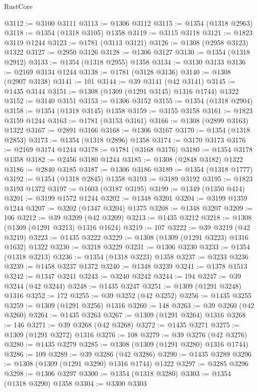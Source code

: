 \begin{lexlean}{RustCore}
\begin{coremodule}
@3112 := @3100 @3111
@3113 := @1306 @3112
@3115 := @1354 (@1318 @2963)
@3118 := @1354 (@1318 @3105) @1358
@3119 := @3115 @3118
@3121 := @1823 @3119 @1244
@3123 := @1781 (@3113 @3121)
@3126 := @1308 (@2958 @3123) @1322
@3127 := @2950 @3126
@3128 := @1306 @3127
@3130 := @1354 (@1318 @2912)
@3133 := @1354 (@1318 @2955) @1358
@3134 := @3130 @3133
@3136 := @2169 @3134 @1244
@3138 := @1781 (@3128 @3136)
@3140 := @1308 (@2907 @3138)
@3141 := 101
@3144 := @39 @3141 (@42 @3141)
@3145 := @1435 @3144
@3151 := @1308 (@1309 (@1291 @3145) @1316 @1744) @1322
@3152 := @3140 @3151
@3153 := @1306 @3152
@3155 := @1354 (@1318 @2904)
@3158 := @1354 (@1318 @3145) @1358
@3159 := @3155 @3158
@3161 := @1823 @3159 @1244
@3163 := @1781 (@3153 @3161)
@3166 := @1308 (@2899 @3163) @1322
@3167 := @2891 @3166
@3168 := @1306 @3167
@3170 := @1354 (@1318 @2853)
@3173 := @1354 (@1318 @2896) @1358
@3174 := @3170 @3173
@3176 := @2169 @3174 @1244
@3178 := @1781 (@3168 @3176)
@3180 := @1354 @3178 @1358
@3182 := @2456 @3180 @1244
@3185 := @1308 (@2848 @3182) @1322
@3186 := @2840 @3185
@3187 := @1306 @3186
@3189 := @1354 (@1318 @1777)
@3192 := @1354 (@1318 @2845) @1358
@3193 := @3189 @3192
@3195 := @1823 @3193 @1372
@3197 := @1603 (@3187 @3195)
@3199 := @1349 (@1350 @414)
@3201 := @3199 @1572 @1244
@3202 := @1348 @3201
@3204 := @3199 @1359 @1244
@3207 := @3202 (@1347 @3204) @1375
@3208 := @1348 @3207
@3209 := 106
@3212 := @39 @3209 (@42 @3209)
@3213 := @1435 @3212
@3218 := @1308 (@1309 (@1291 @3213) @1316 @1624)
@3219 := 107
@3222 := @39 @3219 (@42 @3219)
@3223 := @1435 @3222
@3229 := @1308 (@1309 (@1291 @3223) @1316 @1632) @1322
@3230 := @3218 @3229
@3231 := @1306 @3230
@3233 := @1354 (@1318 @3213)
@3236 := @1354 (@1318 @3223) @1358
@3237 := @3233 @3236
@3239 := @1458 @3237 @1372
@3240 := @1348 @3239
@3241 := @1378 @1513
@3242 := @1347 @3241
@3243 := @3240 @3242
@3244 := 194
@3247 := @39 @3244 (@42 @3244)
@3248 := @1435 @3247
@3251 := @1309 (@1291 @3248) @1316
@3252 := 172
@3255 := @39 @3252 (@42 @3252)
@3256 := @1435 @3255
@3259 := @1309 (@1291 @3256) @1316
@3260 := 148
@3263 := @39 @3260 (@42 @3260)
@3264 := @1435 @3263
@3267 := @1309 (@1291 @3264) @1316
@3268 := 146
@3271 := @39 @3268 (@42 @3268)
@3272 := @1435 @3271
@3275 := @1309 (@1291 @3272) @1316
@3276 := 108
@3279 := @39 @3276 (@42 @3276)
@3280 := @1435 @3279
@3285 := @1308 (@1309 (@1291 @3280) @1316 @1744)
@3286 := 109
@3289 := @39 @3286 (@42 @3286)
@3290 := @1435 @3289
@3296 := @1308 (@1309 (@1291 @3290) @1316 @1744) @1322
@3297 := @3285 @3296
@3298 := @1306 @3297
@3300 := @1354 (@1318 @3280)
@3303 := @1354 (@1318 @3290) @1358
@3304 := @3300 @3303

\end{coremodule}
\end{lexlean}
